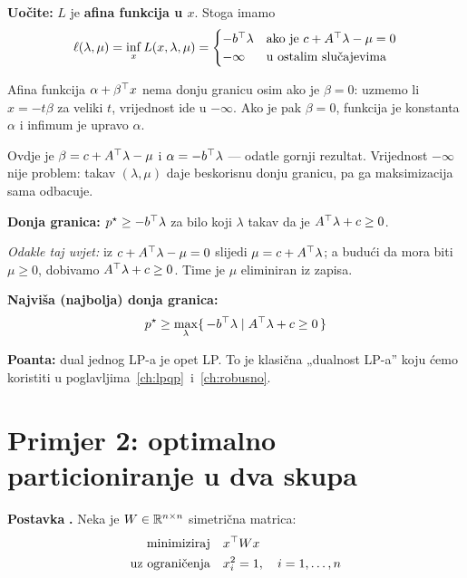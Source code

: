 \textbf{Uočite:} $L$ je \textbf{afina funkcija u $x$}. Stoga imamo
\begin{equation}
\ell(\lambda,\mu) = \inf_x L(x,\lambda,\mu) =
\begin{cases}
-b\T\lambda & \text{ako je } c + A\T\lambda - \mu = 0 \\
-\infty & \text{u ostalim slučajevima}
\end{cases}
\end{equation}

\begin{napomena}
Afina funkcija $\alpha + \beta\T x$ nema donju granicu osim ako je
$\beta = 0$: uzmemo li $x = -t\beta$ za veliki $t$, vrijednost ide u
$-\infty$. Ako je pak $\beta = 0$, funkcija je konstanta $\alpha$ i infimum je
upravo $\alpha$.

Ovdje je $\beta = c + A\T\lambda - \mu$ i $\alpha = -b\T\lambda$ --- odatle
gornji rezultat. Vrijednost $-\infty$ nije problem: takav $(\lambda,\mu)$ daje
beskorisnu donju granicu, pa ga maksimizacija sama odbacuje.
\end{napomena}

\textbf{Donja granica:} $p\opt \ge -b\T\lambda$ za bilo koji $\lambda$ takav da
je $A\T\lambda + c \ge 0$.

\emph{Odakle taj uvjet:} iz $c + A\T\lambda - \mu = 0$ slijedi
$\mu = c + A\T\lambda$; a budući da mora biti $\mu \ge 0$, dobivamo
$A\T\lambda + c \ge 0$. Time je $\mu$ eliminiran iz zapisa.

\textbf{Najviša (najbolja) donja granica:}
\[
p\opt \ge \max_\lambda\{\, -b\T\lambda \mid A\T\lambda + c \ge 0 \,\}
\]

\textbf{Poanta:} dual jednog LP-a je opet LP. To je klasična „dualnost LP-a”
koju ćemo koristiti u poglavljima~\ref{ch:lpqp}~i~\ref{ch:robusno}.

\section{Primjer 2: optimalno particioniranje u dva skupa}
\label{sec:particioniranje}

\textbf{Postavka} \textbf{.} Neka je $W \in \R^{n\times n}$ simetrična
matrica:
\begin{equation}
\begin{aligned}
\minim & x\T W x \\
\uzogr & x_i^2 = 1, \quad i = 1,\dots,n
\end{aligned}
\end{equation}

